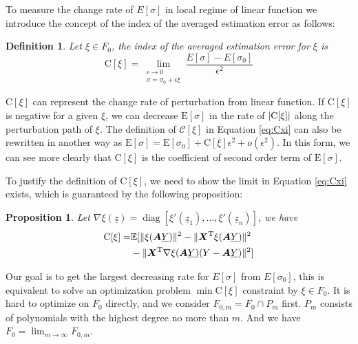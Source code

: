 \documentclass[conference]{IEEEtran}
\newtheorem{definition}{Definition}
\newtheorem{proposition}{Proposition}
\DeclarePairedDelimiter\abs{\lvert}{\rvert}
\DeclarePairedDelimiter\norm{\lVert}{\rVert}
\def\E{\mathbb{E}}
\def\T{\mathrm{T}}
\DeclareMathOperator*{\diag}{diag}
\begin{document}
To measure the change rate of $E[\sigma]$ in local regime of linear function we introduce the concept of the index of the averaged estimation error as follows:
\begin{definition}
Let $\xi \in F_0$, the index of the averaged estimation error for $\xi$ is
\begin{equation}\label{eq:Cxi}
\mathrm{C}[\xi] = \lim_{\substack{\epsilon \to 0 \\ \sigma = \sigma_0 + \epsilon \xi}} \frac{E[\sigma] - E[\sigma_0]}{\epsilon^2}
\end{equation}
\end{definition}

$\mathrm{C}[\xi]$ can represent the change rate of perturbation from linear function. If $\mathrm{C}[\xi]$ is negative for a given $\xi$, we can decrease $\mathrm{E}[\sigma]$ in the rate of $\abs{\mathrm{C}[\xi]}$ along  the perturbation path of $\xi$.
The definition of $\mathcal{C}[\xi]$ in Equation \eqref{eq:Cxi} can also be rewritten in another way as
$\mathrm{E}[\sigma] = \mathrm{E}[\sigma_0] +
\mathrm{C}[\xi]\epsilon^2 + o(\epsilon^2)$. In this form, we can see more clearly that $\mathrm{C}[\xi]$ is the coefficient of second order term of $\mathrm{E}[\sigma]$.

To justify the definition of $\mathrm{C}[\xi]$, we need to show the limit in Equation \eqref{eq:Cxi} exists, which is guaranteed by the following proposition:

\begin{proposition}\label{prop:Esigma} 
Let $\nabla \xi(\underline{z})  = \diag[\xi'(\underline{z}_1), \dots, \xi'(\underline{z}_n)]$, we have
\begin{align}\notag
\mathrm{C}[\xi]= & \E[\norm{\xi(\bm{A}\underline{Y})}^2 -
\norm{\bm{X}^\T\xi(\bm{A}\underline{Y})}^2 \\
&- \norm{\bm{X}^\T \nabla\xi(\bm{A}\underline{Y})(Y-\bm{A}\underline{Y})}^2]
\end{align}
\end{proposition}

Our goal is to get the largest decreasing rate for $E[\sigma]$ from $E[\sigma_0]$, this is equivalent to solve an optimization problem $\min \mathrm{C}[\xi]$ constraint by $\xi \in F_0$. It is hard to optimize on $F_0$ directly, and we consider $F_{0,m} = F_0 \cap P_m$ first. $P_m$ consists of polynomials with the highest degree no more than $m$. And we have $F_0 = \lim_{m\to \infty} F_{0,m}$.
\end{document}
